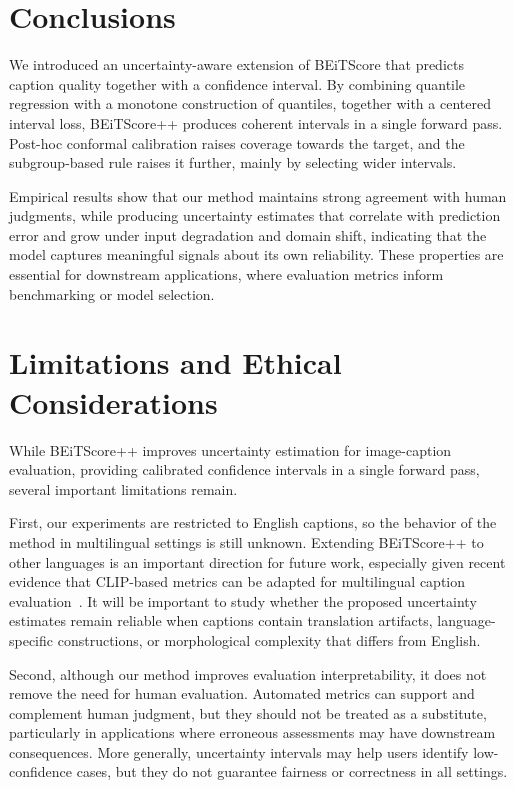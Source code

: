 \documentclass[11pt]{article}
\begin{document}
\vspace{-0.13cm}
\section{Conclusions}
\vspace{-0.13cm}

We introduced an uncertainty-aware extension of BEiTScore that predicts caption quality together with a confidence interval. By combining quantile regression with a monotone construction of quantiles, together with a centered interval loss, BEiTScore++ produces coherent intervals in a single forward pass. Post-hoc conformal calibration raises coverage towards the target, and the subgroup-based rule raises it further, mainly by selecting wider intervals.

Empirical results show that our method maintains strong agreement with human judgments, while producing uncertainty estimates that correlate with prediction error and grow under input degradation and domain shift, indicating that the model captures meaningful signals about its own reliability. These properties are essential for downstream applications, where evaluation metrics inform benchmarking or model selection.

\section*{Limitations and Ethical Considerations}

While BEiTScore++ improves uncertainty estimation for image-caption evaluation, providing calibrated confidence intervals in a single forward pass, several important limitations remain. 

First, our experiments are restricted to English captions, so the behavior of the method in multilingual settings is still unknown. Extending BEiTScore++ to other languages is an important direction for future work, especially given recent evidence that CLIP-based metrics can be adapted for multilingual caption evaluation~\cite{gomes2025evaluation}. It will be important to study whether the proposed uncertainty estimates remain reliable when captions contain translation artifacts, language-specific constructions, or morphological complexity that differs from English.

Second, although our method improves evaluation interpretability, it does not remove the need for human evaluation. Automated metrics can support and complement human judgment, but they should not be treated as a substitute, particularly in applications where erroneous assessments may have downstream consequences. More generally, uncertainty intervals may help users identify low-confidence cases, but they do not guarantee fairness or correctness in all settings.
\end{document}
